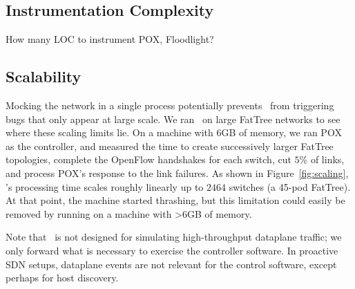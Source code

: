 %



\subsection{Instrumentation Complexity}

How many LOC to instrument POX, Floodlight?

\subsection{Scalability}

Mocking the network in a single process potentially prevents \projectname~from
triggering bugs that only appear at large scale. We ran
\projectname~on large FatTree networks to see where these scaling limits lie.
On a machine with 6GB of memory, we ran POX as the controller, and measured the
time to create successively larger FatTree
topologies, complete the OpenFlow handshakes for each switch,
cut $5\%$ of links, and process POX's response to the link failures. As shown in
Figure~\ref{fig:scaling}, \projectname's processing time scales roughly
linearly up to $2464$ switches (a 45-pod FatTree). At that point, the machine
started thrashing, but this limitation could easily be removed by running on a
machine with >6GB of memory.

Note that \projectname~is not designed for simulating high-throughput dataplane
traffic; we only forward what is necessary to exercise the controller
software. In proactive SDN setups, dataplane events are not
relevant for the control software, except perhaps for host discovery.

